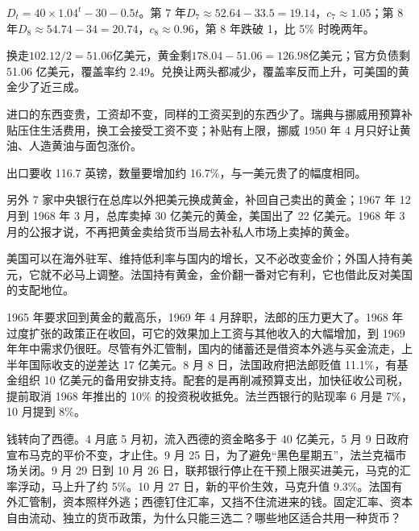 \begin{answers}
\item $D_t=40\times1.04^t-30-0.5t$。第 7 年$D_7\approx52.64-33.5=19.14$，$c_7\approx1.05$；第 8 年$D_8\approx54.74-34=20.74$，$c_8\approx0.96$，第 8 年跌破 1，比 5\% 时晚两年。
\item 换走$102.12/2=51.06$亿美元，黄金剩$178.04-51.06=126.98$亿美元；官方负债剩 51.06 亿美元，覆盖率约 2.49。兑换让两头都减少，覆盖率反而上升，可美国的黄金少了近三成。
\item 进口的东西变贵，工资却不变，同样的工资买到的东西少了。瑞典与挪威用预算补贴压住生活费用，换工会接受工资不变；补贴有上限，挪威 1950 年 4 月只好让黄油、人造黄油与面包涨价。
\item 出口要收 116.7 英镑，数量要增加约 16.7\%，与一美元贵了的幅度相同。
\item 另外 7 家中央银行在总库以外把美元换成黄金，补回自己卖出的黄金；1967 年 12 月到 1968 年 3 月，总库卖掉 30 亿美元的黄金，美国出了 22 亿美元。1968 年 3 月的公报才说，不再把黄金卖给货币当局去补私人市场上卖掉的黄金。
\item 美国可以在海外驻军、维持低利率与国内的增长，又不必改变金价；外国人持有美元，它就不必马上调整。法国持有黄金，金价翻一番对它有利，它也借此反对美国的支配地位。
\end{answers}

1965 年要求回到黄金的戴高乐，1969 年 4 月辞职，法郎的压力更大了\cite{bis36}。1968 年过度扩张的政策正在收回，可它的效果加上工资与其他收入的大幅增加，到 1969 年年中需求仍很旺\cite{bis36}。尽管有外汇管制，国内的储蓄还是借资本外逃与买金流走，上半年国际收支的逆差达 17 亿美元\cite{bis36}。8 月 8 日，法国政府把法郎贬值 11.1\%，有基金组织 10 亿美元的备用安排支持\cite{bis36}。配套的是再削减预算支出，加快征收公司税，提前取消 1968 年推出的 10\% 的投资税收抵免\cite{bis36}。法兰西银行的贴现率 6 月是 7\%，10 月提到 8\%\cite{bis36}。

钱转向了西德。4 月底 5 月初，流入西德的资金略多于 40 亿美元，5 月 9 日政府宣布马克的平价不变，才止住\cite{bis36}。9 月 25 日，为了避免“黑色星期五”，法兰克福市场关闭\cite{bis36}。9 月 29 日到 10 月 26 日，联邦银行停止在干预上限买进美元，马克的汇率浮动，马上升了约 5\%\cite{bis36,bordo1993}。10 月 27 日，新的平价生效，马克升值 9.3\%\cite{bis36}。法国有外汇管制，资本照样外逃；西德钉住汇率，又挡不住流进来的钱。固定汇率、资本自由流动、独立的货币政策，为什么只能三选二？哪些地区适合共用一种货币？
